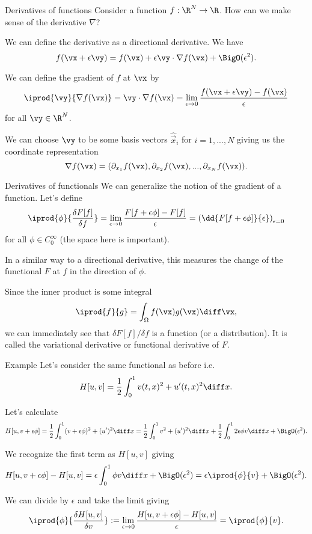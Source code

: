 \begin{frame}{Derivatives of functions}
	Consider a function $ f: \R^N \to \R $. How can we make sense of the derivative $ \nabla $?
	
	\pause
	We can define the derivative as a directional derivative. We have
	\[ f(\vx + \epsilon \vy) = f(\vx) + \epsilon \vy \cdot \nabla f(\vx) + \BigO(\epsilon^2).   \]
	
	\pause
	We can define the gradient of $ f $ at $ \vx $ by 
	\[ \iprod{\vy}{\nabla f(\vx)} = \vy \cdot \nabla f(\vx)  = \lim_{\epsilon \to 0} \frac{f(\vx + \epsilon \vy) - f(\vx)}{\epsilon} \]
	for all $ \vy \in \R^N $.
	
	\pause
	We can choose $ \vy $ to be some basis vectors $ \hat{\vec{x}}_i $ for $ i = 1, ..., N $ giving us the coordinate representation 
	\[ \nabla f(\vx) = (\partial_{x_1} f(\vx), \partial_{x_2} f(\vx), ... , \partial_{x_N} f(\vx)) . \]
\end{frame}

\begin{frame}{Derivatives of functionals}
	We can generalize the notion of the gradient of a function. Let's define
	\[ \iprod{\phi}{\frac{\delta F[f]}{\delta f}} = \lim_{\epsilon \to 0} \frac{F[f + \epsilon \phi]- F[f]}{\epsilon} = \left( \dd{F[f+\epsilon \phi]}{\epsilon} \right)_{\epsilon = 0} \]
	for all $ \phi \in C_0^\infty $ (the space here is important).
	
	\pause
	In a similar way to a directional derivative, this measures the change of the functional $ F $ at $ f $ in the direction of $ \phi $. 
	
	\pause
	Since the inner product is some integral 
	\[ \iprod{f}{g} = \int_{\Omega} f(\vx) g(\vx) \diff \vx, \]
	we can immediately see that 
	$ \delta F[f]/\delta f $
	is a function (or a distribution). It is called the \alert{variational derivative} or \alert{functional derivative} of $ F $. 
\end{frame}

\begin{frame}{Example}
	Let's consider the same functional as before i.e. 
	\[ H[u,v] = \frac{1}{2} \int_{0}^{1} v(t,x)^2 + u'(t,x)^2 \diff x.  \]
	
	\pause
	Let's calculate
	\[ H[u, v + \epsilon \phi]  = \frac{1}{2} \int_{0}^{1}  (v + \epsilon \phi)^2 + (u')^2  \diff x 
	= \frac{1}{2} \int_{0}^{1} v^2 + (u')^2 \diff x + \frac{1}{2} \int_{0}^1 2 \epsilon \phi v \diff x + \BigO(\epsilon^2).
	\] 
	
	\pause
	We recognize the first term as $ H[u,v] $ giving
	\[ H[u, v + \epsilon \phi] - H[u,v] = \epsilon \int_{0}^1 \phi v \diff x + \BigO(\epsilon^2)
	= \epsilon \iprod{\phi}{v} + \BigO(\epsilon^2).
	\]
	
	\pause
	We can divide by $ \epsilon $ and take the limit giving 
	\[ \iprod{\phi}{\frac{\delta H[u,v]}{\delta v}} :=  \lim_{\epsilon \to 0} \frac{H[u, v + \epsilon \phi] - H[u,v]}{\epsilon}  = \iprod{\phi}{v}.  \]
	
\end{frame}

